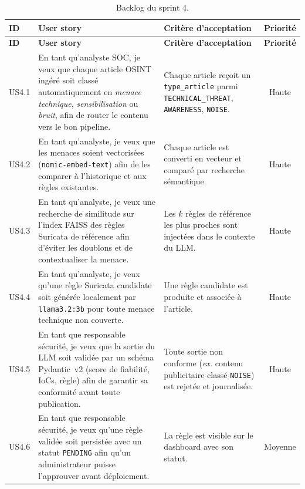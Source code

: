 \renewcommand{\arraystretch}{1.25}
\small
\begin{xltabular}{\textwidth}{|l|>{\raggedright\arraybackslash}X|>{\raggedright\arraybackslash}X|c|}

\caption{Backlog du sprint 4.}
\label{tab:backlog-s4} \\

\hline
{}
\textbf{ID} & \textbf{User story} & \textbf{Critère d'acceptation} & \textbf{Priorité} \\ \hline
\endfirsthead

\hline
{}
\textbf{ID} & \textbf{User story} & \textbf{Critère d'acceptation} & \textbf{Priorité} \\ \hline
\endhead

US4.1 & En tant qu'analyste SOC, je veux que chaque article \ac{OSINT} ingéré soit classé automatiquement en \emph{menace technique}, \emph{sensibilisation} ou \emph{bruit}, afin de router le contenu vers le bon pipeline. & Chaque article reçoit un \texttt{type\_article} parmi \texttt{TECHNICAL\_THREAT}, \texttt{AWARENESS}, \texttt{NOISE}. & Haute \\ \hline
US4.2 & En tant qu'analyste, je veux que les menaces soient vectorisées (\texttt{nomic-embed-text}) afin de les comparer à l'historique et aux règles existantes. & Chaque article est converti en vecteur et comparé par recherche sémantique. & Haute \\ \hline
US4.3 & En tant qu'analyste, je veux une recherche de similitude sur l'index \ac{FAISS} des règles Suricata de référence afin d'éviter les doublons et de contextualiser la menace. & Les $k$ règles de référence les plus proches sont injectées dans le contexte du \ac{LLM}. & Haute \\ \hline
US4.4 & En tant qu'analyste, je veux qu'une règle Suricata candidate soit générée localement par \texttt{llama3.2:3b} pour toute menace technique non couverte. & Une règle candidate est produite et associée à l'article. & Haute \\ \hline
US4.5 & En tant que responsable sécurité, je veux que la sortie du \ac{LLM} soit validée par un schéma Pydantic~v2 (score de fiabilité, \ac{IoC}s, règle) afin de garantir sa conformité avant toute publication. & Toute sortie non conforme (\emph{ex.} contenu publicitaire classé \texttt{NOISE}) est rejetée et journalisée. & Haute \\ \hline
US4.6 & En tant que responsable sécurité, je veux qu'une règle validée soit persistée avec un statut \texttt{PENDING} afin qu'un administrateur puisse l'approuver avant déploiement. & La règle est visible sur le dashboard avec son statut. & Moyenne \\ \hline

\end{xltabular}

